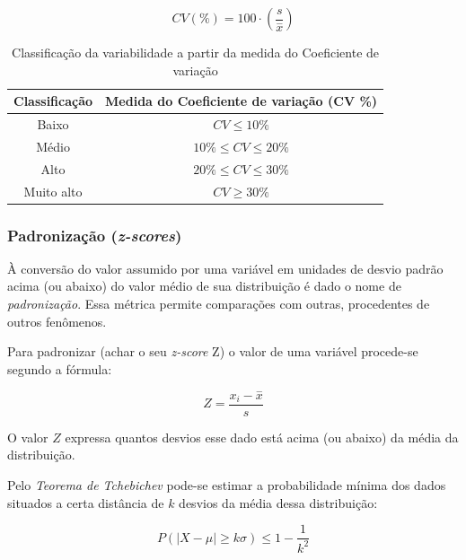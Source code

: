 \documentclass[
]{book}
\begin{document}
\hfill\break

\[
CV(\%)= 100\cdot(\frac{s}{\stackrel{-}{x}})
\]

\hfill\break

\begin{table}[h]
\centering
\caption{Classificação da variabilidade a partir da medida do Coeficiente de variação}
\begin{tabular}{|c|c|}
\hline 
Classificação  & Medida do Coeficiente de variação (CV \%) \\ 
\hline 
Baixo & $CV \le 10\%$ \\
\hline 
Médio  & $10\% \le CV \le 20\%$ \\
\hline 
Alto  & $20\% \le CV \le 30\%$ \\
\hline 
Muito alto & $CV \ge 30\%$ \\
\hline 
\end{tabular}
\end{table}

\hfill\break

\hypertarget{padronizauxe7uxe3o-z-scores}{%
\subsubsection{\texorpdfstring{Padronização (\emph{z-scores})}{Padronização (z-scores)}}\label{padronizauxe7uxe3o-z-scores}}

\hfill\break

À conversão do valor assumido por uma variável em unidades de desvio padrão acima (ou abaixo) do valor médio de sua distribuição é dado o nome de \emph{padronização}. Essa métrica permite comparações com outras, procedentes de outros fenômenos.

\hfill\break

Para padronizar (achar o seu \emph{z-score} Z) o valor de uma variável procede-se segundo a fórmula:

\hfill\break

\[
Z=\frac{x_{i} - \stackrel{-}{x}}{s}
\]

\hfill\break
O valor \(Z\) expressa quantos desvios esse dado está acima (ou abaixo) da média da distribuição.

\hfill\break

Pelo \emph{Teorema de Tchebichev} pode-se estimar a probabilidade mínima dos dados situados a certa distância de \(k\) desvios da média dessa distribuição:

\hfill\break

\[
P(|X-\mu|\ge k\sigma) \leq 1 - \frac{1}{k^{2}}
\]
\end{document}
